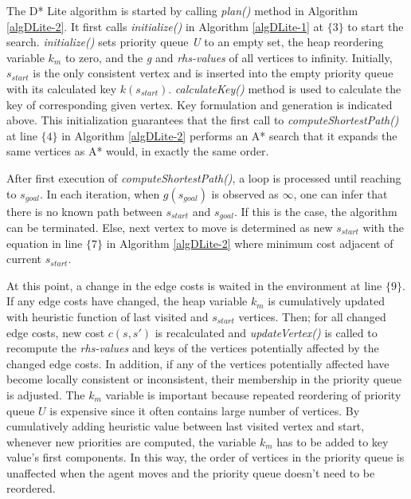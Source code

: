 \documentclass[10pt,journal]{IEEEtran}
\begin{document}
The D* Lite algorithm is started by calling \textit{plan()} method in Algorithm \ref{algDLite-2}. It first calls \textit{initialize()} in Algorithm \ref{algDLite-1} at $\lbrace 3 \rbrace$ to start the search. \textit{initialize()} sets priority queue \textit{U} to an empty set, the heap reordering variable $k_{m}$ to zero, and the \textit{g} and \textit{rhs-values} of all vertices to infinity. Initially, $s_{start}$ is the only consistent vertex and is inserted into the empty priority queue with its calculated key $k(s_{start})$. \textit{calculateKey()} method is used to calculate the key of corresponding given vertex. Key formulation and generation is indicated above. This initialization guarantees that the first call to \textit{computeShortestPath()} at line $\lbrace 4 \rbrace$ in Algorithm \ref{algDLite-2} performs an A* search that it expands the same vertices as A* would, in exactly the same order.

After first execution of \textit{computeShortestPath()}, a loop is processed until reaching to $s_{goal}$. In each iteration, when $g(s_{goal})$ is observed as $\infty$, one can infer that there is no known path between $s_{start}$ and $s_{goal}$. If this is the case, the algorithm can be terminated. Else, next vertex to move is determined as new $s_{start}$ with the equation in line $\lbrace 7 \rbrace$ in Algorithm \ref{algDLite-2} where minimum cost adjacent of current $s_{start}$.

At this point, a change in the edge costs is waited in the environment at line $\lbrace 9 \rbrace$. If any edge costs have changed, the heap variable $k_{m}$ is cumulatively updated with heuristic function of last visited and $s_{start}$ vertices. Then; for all changed edge costs, new cost $c(s, s')$ is recalculated and \textit{updateVertex()} is called to recompute the \textit{rhs-values} and keys of the vertices potentially affected by the changed edge costs. In addition, if any of the vertices potentially affected have become locally consistent or inconsistent, their membership in the priority queue is adjusted. The $k_{m}$ variable is important because repeated reordering of priority queue $U$ is expensive since it often contains large number of vertices. By cumulatively adding heuristic value between last visited vertex and start, whenever new priorities are computed, the variable $k_{m}$ has to be added to key value's first components. In this way, the order of vertices in the priority queue is unaffected when the agent moves and the priority queue doesn't need to be reordered.
\end{document}
